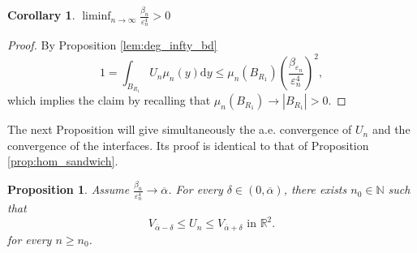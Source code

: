 \documentclass[10pt,a4paper]{article}
\newcommand{\NN}{\mathbb{N}}
\newcommand{\RR}{\mathbb{R}}
\newtheorem{prop}[thm]{Proposition}
\newtheorem{cor}[thm]{Corollary}
\numberwithin{equation}{section}
\begin{document}
\begin{cor}
	\label{cor:deg_bounds}
	$ \liminf_{n\rightarrow \infty} \frac{\beta_{n}}{\varepsilon_n^{4}} > 0 $
\end{cor}

\begin{proof}
	By Proposition \ref{lem:deg_infty_bd} 
	\[1 = \int_{B_{R_1}}U_n \mu_n(y) \mathrm{d}y \leq \mu_n(B_{R_1})\left( \dfrac{\beta_{\varepsilon_n}}{\varepsilon_n^{4}} \right)^{2},\]
which implies the claim by recalling that $\mu_n(B_{R_1}) \rightarrow |B_{R_1}| > 0$.
\end{proof}

The next Proposition will give simultaneously the a.e. convergence of $ U_n $ and the convergence of the interfaces. Its proof is identical to that of Proposition \ref{prop:hom_sandwich}.
\begin{prop}
	\label{prop:sandwich}
	Assume $ \frac{\beta_n}{\varepsilon_n^{4}} \rightarrow \overline{\alpha} $. For every $\delta \in (0, \overline{\alpha})$, there exists $ n_0 \in \NN $ such that 
	\begin{equation}
	\label{eq:deg_sandwich}
		V_{\overline{\alpha} - \delta} \leq U_n \leq V_{\overline{\alpha} + \delta} \text{ in } \RR^{2}.
	\end{equation}
	for every $n\geq n_0$.
\end{prop}
\end{document}
